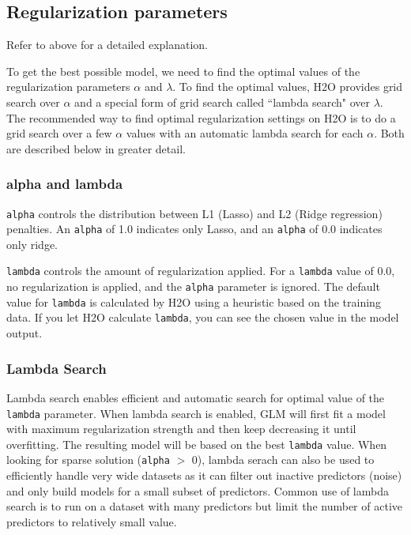 \subsection{Regularization parameters}

Refer to  above for a detailed explanation.

To get the best possible model, we need to find the optimal values of the regularization parameters $\alpha$ and
$\lambda$.  To find the optimal values, H2O provides grid search over $\alpha$ and a special form of grid search
called ``lambda search" over $\lambda$. The recommended way to find optimal regularization settings on H2O is to do
a grid search over a few $\alpha$ values with an automatic lambda search for each $\alpha$. Both are described
below in greater detail.

\subsubsection{alpha and lambda}

\texttt{alpha} controls the distribution between L1 (Lasso) and L2 (Ridge regression) penalties.  An \texttt{alpha} 
of 1.0 indicates only Lasso, and an \texttt{alpha} of 0.0 indicates only ridge.

\texttt{lambda} controls the amount of regularization applied.  For a \texttt{lambda} value of 0.0, no 
regularization is applied, and the \texttt{alpha} parameter is ignored.  The default value for \texttt{lambda} is
calculated by H2O using a heuristic based on the training data.  If you let H2O calculate \texttt{lambda}, you can
see the chosen value in the model output.

\subsubsection{Lambda Search}
Lambda search enables efficient and automatic search for optimal value of the \texttt{lambda} parameter. When lambda search is enabled, GLM will first fit a model with maximum regularization strength and then keep decreasing it until overfitting. The resulting model will be based on the best \texttt{lambda} value. When looking for sparse solution (\texttt{alpha} $>$ 0), lambda serach can also be used to efficiently handle very wide datasets as it can filter out inactive predictors (noise) and only build models for a small subset of predictors. Common use of lambda search is to run on a dataset with many predictors but limit the number of active predictors to relatively small value.  

